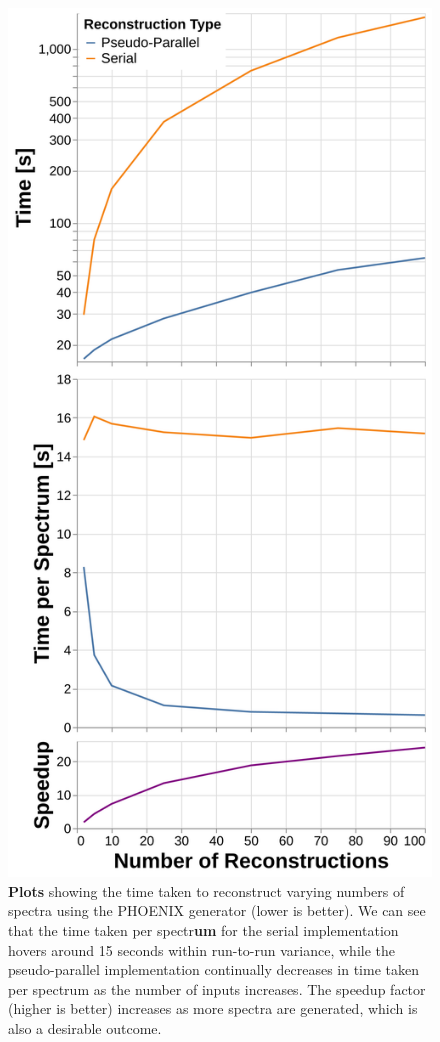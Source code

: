 \documentclass[twocolumn, linenumbers]{aastex631}
\begin{document}
\begin{figure}[t!]
    \centering
    \includegraphics[width=\columnwidth]{figure8}
    \caption{\textbf{Plots} showing the time taken to reconstruct varying numbers of spectra using the PHOENIX generator (lower is better).
    We can see that the time taken per spectr\textbf{um} for the serial implementation hovers around 15 seconds within run-to-run variance, while the pseudo-parallel implementation continually decreases in time taken per spectrum as the number of inputs increases.
    The speedup factor (higher is better) increases as more spectra are generated, which is also a desirable outcome.}
    \label{fig:figure8}
\end{figure}
\end{document}
